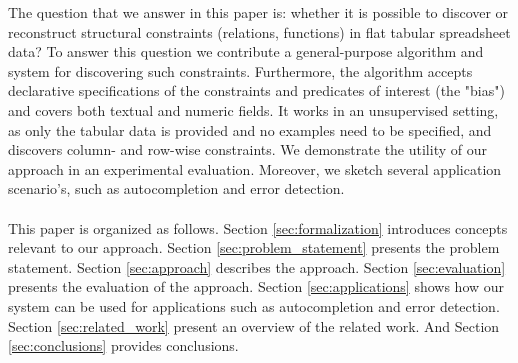 \documentclass{sig-alternate-05-2015}
\begin{document}
The question that we answer in this paper is: whether it is possible to discover or reconstruct structural constraints (relations, functions) in flat tabular spreadsheet data?
To answer this question we contribute a general-purpose algorithm and system for discovering such constraints. Furthermore, the algorithm accepts declarative specifications of the constraints and predicates of interest (the "bias") and covers both textual and numeric fields. It works in an unsupervised setting, as only the tabular data is provided and no examples need to be specified, and discovers column- and row-wise constraints.
We demonstrate the utility of our approach in an experimental evaluation.
Moreover, we sketch several application scenario's, such as autocompletion and error detection.
\\\\
This paper is organized as follows.
Section \ref{sec:formalization} introduces concepts relevant to our approach. Section \ref{sec:problem_statement} presents the problem statement. Section \ref{sec:approach} describes the approach. Section \ref{sec:evaluation} presents the evaluation of the approach. Section \ref{sec:applications} shows how our system can be used for applications such as autocompletion and error detection. Section \ref{sec:related_work} present an overview of the related work. And Section \ref{sec:conclusions} provides conclusions.


\end{document}
